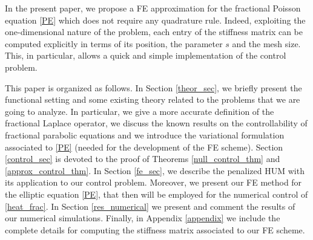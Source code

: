 In the present paper, we propose a FE approximation for the fractional Poisson equation \eqref{PE} which does not require any quadrature rule. Indeed, exploiting the one-dimensional nature of the problem, each entry of the stiffness matrix can be computed explicitly in terms of its position, the parameter $s$ and the mesh size. This, in particular, allows a quick and simple implementation of the control problem.

This paper is organized as follows. In Section \ref{theor_sec}, we briefly present the functional setting and some existing theory related to the problems that we are going to analyze. In particular, we give a more accurate definition of the fractional Laplace operator, we discuss the known results on the controllability of fractional parabolic equations and we introduce the variational formulation associated to \eqref{PE} (needed for the development of the FE scheme). Section \ref{control_sec} is devoted to the proof of Theorems \ref{null_control_thm} and \ref{approx_control_thm}. In Section \ref{fe_sec}, we describe the penalized HUM with its application to our control problem. Moreover, we present our FE method for the elliptic equation \eqref{PE}, that then will be employed for the numerical control of \eqref{heat_frac}. In Section \ref{res_numerical} we present and comment the results of our numerical simulations. Finally, in Appendix \ref{appendix} we include the complete details for computing the stiffness matrix associated to our FE scheme.

